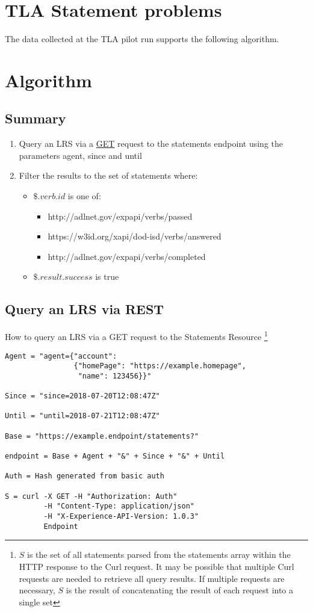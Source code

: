 \documentclass{article}
\begin{document}
\section{TLA Statement problems}
The data collected at the TLA pilot run supports the following algorithm.
\section{Algorithm}
\subsection{Summary}
\begin{enumerate}
  \item Query an LRS via a \href{https://github.com/adlnet/xAPI-Spec/blob/master/xAPI-Communication.md#213-get-statements}{GET} request to the statements endpoint using the parameters agent, since and until
  \item Filter the results to the set of statements where:
    \begin{itemize}
    \item $\$.verb.id$ is one of:
      \begin{itemize}
      \item http://adlnet.gov/expapi/verbs/passed
      \item https://w3id.org/xapi/dod-isd/verbs/answered
      \item http://adlnet.gov/expapi/verbs/completed
      \end{itemize}
    \item $\$.result.success$ is true
    \end{itemize}
  \end{enumerate}

  \subsection{Query an LRS via REST}
  How to query an LRS via a GET request to the Statements Resource
  \footnote{\label{moreLink} $S$ is the set of all statements parsed from the statements array within the HTTP response to the Curl request. It may be possible that multiple Curl requests are needed to retrieve all query results. If multiple requests are necessary, $S$ is the result of concatenating the result of each request into a single set}
  \begin{lstlisting}[frame=single]
Agent = "agent={"account":
                {"homePage": "https://example.homepage",
                 "name": 123456}}"

Since = "since=2018-07-20T12:08:47Z"

Until = "until=2018-07-21T12:08:47Z"

Base = "https://example.endpoint/statements?"

endpoint = Base + Agent + "&" + Since + "&" + Until

Auth = Hash generated from basic auth

S = curl -X GET -H "Authorization: Auth"
         -H "Content-Type: application/json"
         -H "X-Experience-API-Version: 1.0.3"
         Endpoint
  \end{lstlisting}
\end{document}
